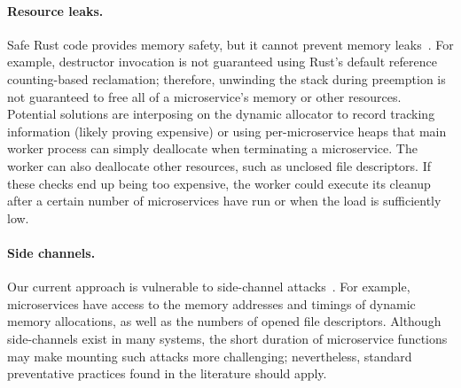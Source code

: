 
\paragraph{Resource leaks.}
Safe Rust code provides memory safety, but it cannot prevent memory
leaks~\cite{www-rustlang-nu}.  For example, destructor invocation is not
guaranteed using Rust's default reference counting-based reclamation; therefore,
unwinding the stack during preemption is not guaranteed to free all of a
microservice's memory or other resources.  Potential solutions are interposing
on the dynamic allocator to record tracking information (likely proving
expensive) or using per-microservice heaps that main worker process can simply
deallocate when terminating a microservice.  The worker can also deallocate
other resources, such as unclosed file descriptors.  If these checks end up
being too expensive, the worker could execute its cleanup after a certain number
of microservices have run or when the load is sufficiently low.

\paragraph{Side channels.}
Our current approach is vulnerable to side-channel
attacks~\cite{Lipp2018,Kocher2018}.  For example, microservices have access to
the memory addresses and timings of dynamic memory allocations, as well as the
numbers of opened file descriptors.  Although side-channels exist in many
systems, the short duration of microservice functions may
make mounting such attacks more challenging; nevertheless, standard
preventative practices found in the literature should apply.

